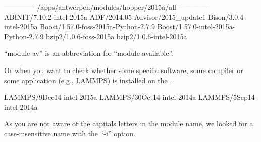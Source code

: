 \begin{prompt}
------------- /apps/antwerpen/modules/hopper/2015a/all ------------
ABINIT/7.10.2-intel-2015a
ADF/2014.05
Advisor/2015_update1
Bison/3.0.4-intel-2015a
Boost/1.57.0-foss-2015a-Python-2.7.9
Boost/1.57.0-intel-2015a-Python-2.7.9
bzip2/1.0.6-foss-2015a
bzip2/1.0.6-intel-2015a
\end{prompt}

``module av'' is an abbreviation for ``module available''.

Or when you want to check whether some specific software, some compiler or some
application (e.g., LAMMPS) is installed on the \hpc.

\begin{prompt}
LAMMPS/9Dec14-intel-2015a
LAMMPS/30Oct14-intel-2014a
LAMMPS/5Sep14-intel-2014a
\end{prompt}

As you are not aware of the capitals letters in the module name, we looked for
a case-insensitive name with the ``-i'' option.
